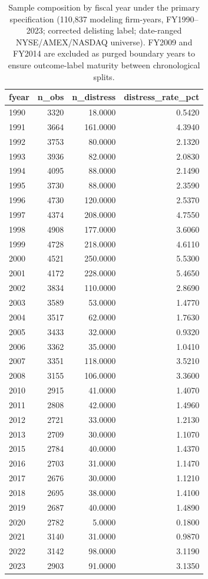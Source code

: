 \begin{table}[htbp]
\centering
\caption{Sample composition by fiscal year under the primary specification (110,837 modeling firm-years, FY1990--2023; corrected delisting label; date-ranged NYSE/AMEX/NASDAQ universe). FY2009 and FY2014 are excluded as purged boundary years to ensure outcome-label maturity between chronological splits.}
\label{tab:sample_annual}
\small
\begin{tabular}{lrrr}
\toprule
fyear & n\_obs & n\_distress & distress\_rate\_pct \\
\midrule
1990 & 3320 & 18.0000 & 0.5420 \\
1991 & 3664 & 161.0000 & 4.3940 \\
1992 & 3753 & 80.0000 & 2.1320 \\
1993 & 3936 & 82.0000 & 2.0830 \\
1994 & 4095 & 88.0000 & 2.1490 \\
1995 & 3730 & 88.0000 & 2.3590 \\
1996 & 4730 & 120.0000 & 2.5370 \\
1997 & 4374 & 208.0000 & 4.7550 \\
1998 & 4908 & 177.0000 & 3.6060 \\
1999 & 4728 & 218.0000 & 4.6110 \\
2000 & 4521 & 250.0000 & 5.5300 \\
2001 & 4172 & 228.0000 & 5.4650 \\
2002 & 3834 & 110.0000 & 2.8690 \\
2003 & 3589 & 53.0000 & 1.4770 \\
2004 & 3517 & 62.0000 & 1.7630 \\
2005 & 3433 & 32.0000 & 0.9320 \\
2006 & 3362 & 35.0000 & 1.0410 \\
2007 & 3351 & 118.0000 & 3.5210 \\
2008 & 3155 & 106.0000 & 3.3600 \\
2010 & 2915 & 41.0000 & 1.4070 \\
2011 & 2808 & 42.0000 & 1.4960 \\
2012 & 2721 & 33.0000 & 1.2130 \\
2013 & 2709 & 30.0000 & 1.1070 \\
2015 & 2784 & 40.0000 & 1.4370 \\
2016 & 2703 & 31.0000 & 1.1470 \\
2017 & 2676 & 30.0000 & 1.1210 \\
2018 & 2695 & 38.0000 & 1.4100 \\
2019 & 2687 & 40.0000 & 1.4890 \\
2020 & 2782 & 5.0000 & 0.1800 \\
2021 & 3140 & 31.0000 & 0.9870 \\
2022 & 3142 & 98.0000 & 3.1190 \\
2023 & 2903 & 91.0000 & 3.1350 \\
\bottomrule
\end{tabular}
\end{table}
